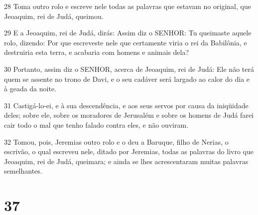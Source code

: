 \par 28 Toma outro rolo e escreve nele todas as palavras que estavam no original, que Jeoaquim, rei de Judá, queimou.
\par 29 E a Jeoaquim, rei de Judá, dirás: Assim diz o SENHOR: Tu queimaste aquele rolo, dizendo: Por que escreveste nele que certamente viria o rei da Babilônia, e destruiria esta terra, e acabaria com homens e animais dela?
\par 30 Portanto, assim diz o SENHOR, acerca de Jeoaquim, rei de Judá: Ele não terá quem se assente no trono de Davi, e o seu cadáver será largado ao calor do dia e à geada da noite.
\par 31 Castigá-lo-ei, e à sua descendência, e aos seus servos por causa da iniqüidade deles; sobre ele, sobre os moradores de Jerusalém e sobre os homens de Judá farei cair todo o mal que tenho falado contra eles, e não ouviram.
\par 32 Tomou, pois, Jeremias outro rolo e o deu a Baruque, filho de Nerias, o escrivão, o qual escreveu nele, ditado por Jeremias, todas as palavras do livro que Jeoaquim, rei de Judá, queimara; e ainda se lhes acrescentaram muitas palavras semelhantes.

\chapter{37}

